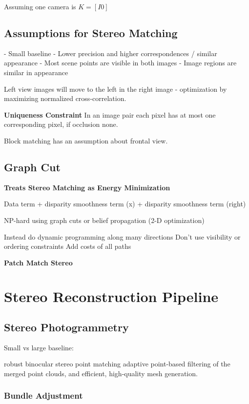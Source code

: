 Assuming one camera is $K = [ I 0]$


\subsection{Assumptions for Stereo Matching}

- Small baseline
  - Lower precision and higher correspondences  / similar appearance
- Most scene points are visible in both images
- Image regions are similar in appearance

Left view images will move to the left in the right image - optimization by maximizing normalized cross-correlation.

\textbf{Uniqueness Constraint} 
In an image pair each pixel has at most one corresponding pixel, if occlusion none.

Block matching has an assumption about frontal view.

\subsection{Graph Cut}

\textbf{Treats Stereo Matching as Energy Minimization}

Data term + disparity smoothness term (x) + disparity smoothness term (right)

NP-hard using graph cuts or belief propagation (2-D optimization)

Instead do dynamic programming along many directions
Don’t use visibility or ordering constraints
Add costs of all paths

\textbf{Patch Match Stereo}


\section{Stereo Reconstruction Pipeline}

\subsection{Stereo Photogrammetry}

Small vs large baseline:

robust binocular stereo
point matching
adaptive point-based filtering of the
merged point clouds, and efficient, high-quality mesh generation.

\subsubsection{Bundle Adjustment}

